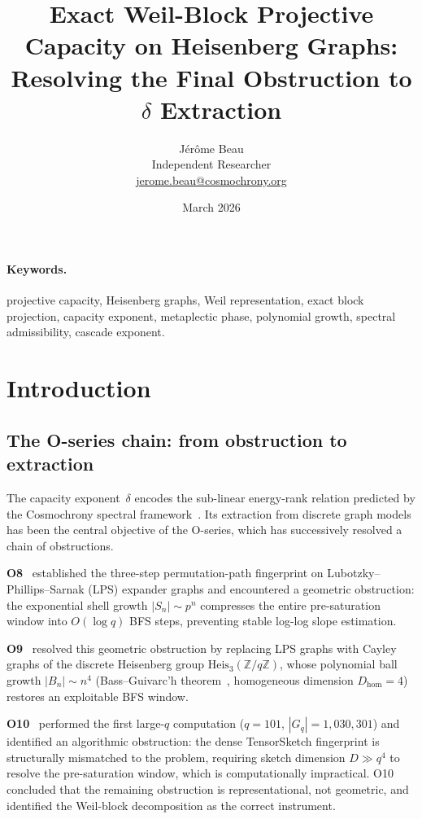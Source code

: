 \documentclass[11pt,a4paper]{article}
\title{Exact Weil-Block Projective Capacity on Heisenberg Graphs:\\
Resolving the Final Obstruction to $\delta$ Extraction}
\author{J\'er\^ome Beau\\
\small Independent Researcher\\
\small \href{mailto:jerome.beau@cosmochrony.org}{jerome.beau@cosmochrony.org}}
\date{March 2026}
\begin{document}
  \maketitle

  \begin{abstract}
    
  \end{abstract}

  \paragraph{Keywords.}
    projective capacity, Heisenberg graphs, Weil representation, exact block projection,
    capacity exponent, metaplectic phase, polynomial growth, spectral admissibility, cascade exponent.

    \clearpage
    \tableofcontents

  \section{Introduction}

  \subsection{The O-series chain: from obstruction to extraction}

    The capacity exponent~$\delta$ encodes the sub-linear energy-rank relation predicted
    by the Cosmochrony spectral framework~\cite{Cosmochrony}.
    Its extraction from discrete graph models has been the central objective of the O-series,
    which has successively resolved a chain of obstructions.

    \textbf{O8}~\cite{Beau2026a12} established the three-step permutation-path fingerprint on
    Lubotzky--Phillips--Sarnak (LPS) expander graphs and encountered a geometric obstruction:
    the exponential shell growth $|S_n|\sim p^n$ compresses the entire pre-saturation window
    into $O(\log q)$ BFS steps, preventing stable log-log slope estimation.

    \textbf{O9}~\cite{Beau2026a13} resolved this geometric obstruction by replacing LPS graphs
    with Cayley graphs of the discrete Heisenberg group $\mathrm{Heis}_3(\mathbb{Z}/q\mathbb{Z})$,
    whose polynomial ball growth $|B_n|\sim n^4$ (Bass--Guivarc'h
    theorem~\cite{Bass1972,Guivarch1973}, homogeneous dimension $D_{\mathrm{hom}}=4$)
    restores an exploitable BFS window.

    \textbf{O10}~\cite{Beau2026a14} performed the first large-$q$ computation ($q=101$,
    $|G_q|=1{,}030{,}301$) and identified an algorithmic obstruction:
    the dense TensorSketch fingerprint is structurally mismatched to the problem,
    requiring sketch dimension $D\gg q^4$ to resolve the pre-saturation window,
    which is computationally impractical.
    O10 concluded that the remaining obstruction is representational, not geometric,
    and identified the Weil-block decomposition as the correct instrument.
\end{document}
